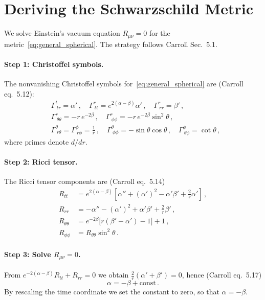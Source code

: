 \section{Deriving the Schwarzschild Metric}
\label{sec:schwarzschild_derivation}

We solve Einstein's vacuum equation $R_{\mu\nu} = 0$ for the
metric~\eqref{eq:general_spherical}.  The strategy follows Carroll
Sec.~5.1.

\paragraph{Step 1: Christoffel symbols.}
The nonvanishing Christoffel symbols for~\eqref{eq:general_spherical} are
(Carroll eq.~5.12):
\begin{align}
    &\Gamma^t_{\ tr} = \alpha' \,,\quad
    \Gamma^r_{\ tt} = e^{2(\alpha-\beta)}\alpha' \,,\quad
    \Gamma^r_{\ rr} = \beta' \,, \nonumber \\
    &\Gamma^r_{\ \theta\theta} = -r\,e^{-2\beta} \,,\quad
    \Gamma^r_{\ \phi\phi} = -r\,e^{-2\beta}\sin^2\theta \,, \nonumber \\
    &\Gamma^\theta_{\ r\theta} = \Gamma^\phi_{\ r\phi} = \frac{1}{r} \,,\quad
    \Gamma^\theta_{\ \phi\phi} = -\sin\theta\cos\theta \,,\quad
    \Gamma^\phi_{\ \theta\phi} = \cot\theta \,,
    \label{eq:christoffel_schwarzschild}
\end{align}
where primes denote $d/dr$.

\paragraph{Step 2: Ricci tensor.}
The Ricci tensor components are (Carroll eq.~5.14)
\begin{align}
    R_{tt} &= e^{2(\alpha-\beta)}\left[
        \alpha'' + (\alpha')^2 - \alpha'\beta' + \frac{2}{r}\alpha'
    \right] \,, \label{eq:Rtt} \\
    R_{rr} &= -\alpha'' - (\alpha')^2 + \alpha'\beta' + \frac{2}{r}\beta'
    \,, \label{eq:Rrr} \\
    R_{\theta\theta} &= e^{-2\beta}\bigl[r(\beta' - \alpha') - 1\bigr] + 1
    \,, \label{eq:Rthth} \\
    R_{\phi\phi} &= R_{\theta\theta}\sin^2\theta \,.
    \label{eq:Rphph}
\end{align}

\paragraph{Step 3: Solve $R_{\mu\nu} = 0$.}
From $e^{-2(\alpha-\beta)}R_{tt} + R_{rr} = 0$ we obtain
$\frac{2}{r}(\alpha' + \beta') = 0$, hence (Carroll eq.~5.17)
\begin{equation}
    \alpha = -\beta + \text{const} \,.
    \label{eq:alpha_beta}
\end{equation}
By rescaling the time coordinate we set the constant to zero, so that
$\alpha = -\beta$.

